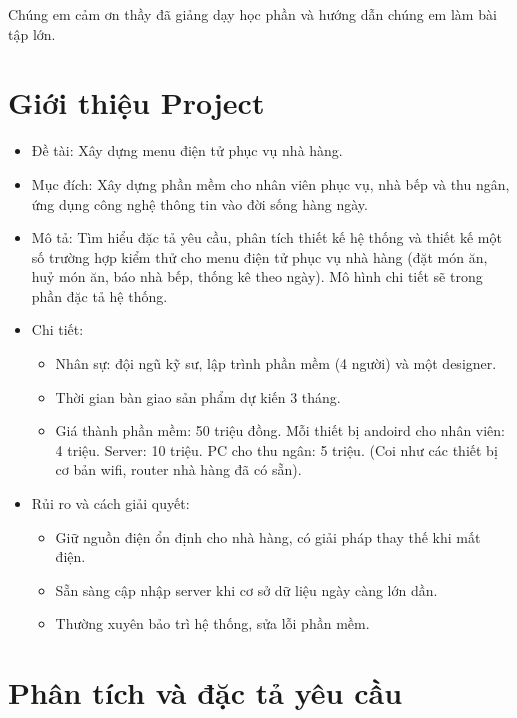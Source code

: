 \documentclass[a4paper,12pt]{report}
\begin{document}
Chúng em cảm ơn thầy đã giảng dạy học phần và hướng dẫn chúng em làm bài tập lớn.

\chapter{Giới thiệu Project}
\begin{itemize}
\item Đề tài: Xây dựng menu điện tử phục vụ nhà hàng. 
\item Mục đích: Xây dựng phần mềm cho nhân viên phục vụ, nhà bếp và thu ngân, ứng dụng công nghệ thông tin vào đời sống hàng ngày.
\item Mô tả: Tìm	hiểu đặc	tả yêu	cầu,	phân	tích	thiết kế hệ thống	và	thiết	kế một	số
trường	hợp	kiểm	thử cho menu	điện	tử phục	vụ nhà	hàng (đặt	món	ăn,	huỷ món	
ăn,	báo	nhà	bếp,	thống	kê	theo	ngày). Mô hình chi tiết sẽ trong phần đặc tả hệ thống.
\item Chi tiết:
\begin{itemize}
       \item Nhân sự: đội ngũ kỹ sư, lập trình phần mềm (4 người) và một designer.
       \item Thời gian bàn giao sản phẩm dự kiến 3 tháng.
       \item Giá thành phần mềm: 50 triệu đồng. Mỗi thiết bị andoird cho nhân viên: 4 triệu. Server: 10 triệu. PC cho thu ngân: 5 triệu. (Coi như các thiết bị cơ bản wifi, router nhà hàng đã có sẵn).
      \end{itemize}
\item Rủi ro và cách giải quyết:
\begin{itemize}
        \item{Giữ nguồn điện ổn định cho nhà hàng, có giải pháp thay thế khi mất điện.}
        \item{Sẵn sàng cập nhập server khi cơ sở dữ liệu ngày càng lớn dần.}
        \item{Thường xuyên bảo trì hệ thống, sửa lỗi phần mềm.}
      \end{itemize}
\end{itemize}


\chapter{Phân tích và đặc tả yêu cầu}
\end{document}
